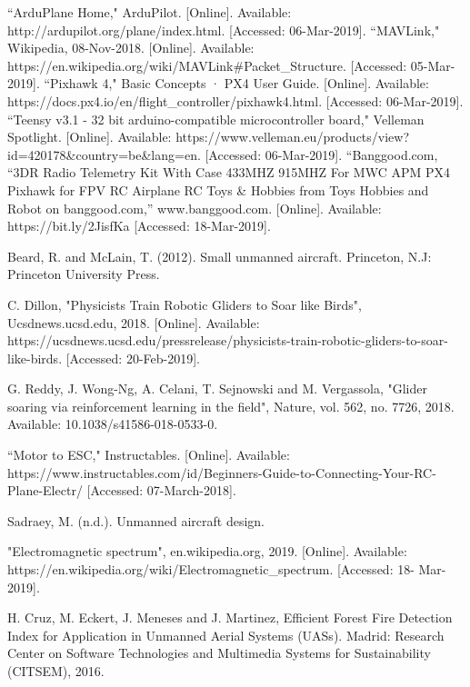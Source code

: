\documentclass[12pt,journal,compsoc]{IEEEtran}
\begin{document}
\begin{thebibliography}{2}
``ArduPlane Home," ArduPilot. [Online]. Available: http://ardupilot.org/plane/index.html. [Accessed: 06-Mar-2019].
``MAVLink," Wikipedia, 08-Nov-2018. [Online]. Available: https://en.wikipedia.org/wiki/MAVLink\#Packet\_Structure. [Accessed: 05-Mar-2019].
``Pixhawk 4," Basic Concepts · PX4 User Guide. [Online]. Available: https://docs.px4.io/en/flight\_controller/pixhawk4.html. [Accessed: 06-Mar-2019].
``Teensy v3.1 - 32 bit arduino-compatible microcontroller board," Velleman Spotlight. [Online]. Available: 
https://www.velleman.eu/products/view\linebreak?id=420178\&country=be\&lang=en. [Accessed: 06-Mar-2019].
``Banggood.com, “3DR Radio Telemetry Kit With Case 433MHZ 915MHZ For MWC APM PX4 Pixhawk for FPV RC Airplane RC Toys \& Hobbies from Toys Hobbies and Robot on banggood.com,” www.banggood.com. [Online]. Available: https://bit.ly/2JisfKa [Accessed: 18-Mar-2019].


Beard, R. and McLain, T. (2012). Small unmanned aircraft. Princeton, N.J: Princeton University Press.

C. Dillon, "Physicists Train Robotic Gliders to Soar like Birds", Ucsdnews.ucsd.edu, 2018. [Online]. Available: https://ucsdnews.ucsd.edu/pressrelease/physicists-train-robotic-gliders-to-soar-like-birds. [Accessed: 20-Feb-2019].

G. Reddy, J. Wong-Ng, A. Celani, T. Sejnowski and M. Vergassola, "Glider soaring via reinforcement learning in the field", Nature, vol. 562, no. 7726, 2018. Available: 10.1038/s41586-018-0533-0.

``Motor to ESC," Instructables. [Online]. Available: https://www.instructables.com/id/Beginners-Guide-to-Connecting-Your-RC-Plane-Electr/ [Accessed: 07-March-2018].

Sadraey, M. (n.d.). Unmanned aircraft design.

"Electromagnetic spectrum", en.wikipedia.org, 2019. [Online]. Available: https://en.wikipedia.org/wiki/Electromagnetic\_spectrum. [Accessed: 18- Mar- 2019].

H. Cruz, M. Eckert, J. Meneses and J. Martinez, Efficient Forest Fire Detection Index for Application in Unmanned Aerial Systems (UASs). Madrid: Research Center on Software Technologies and Multimedia Systems for Sustainability (CITSEM), 2016.


\end{thebibliography}
\end{document}
